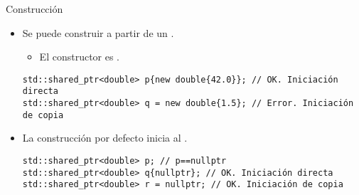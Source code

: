 \begin{frame}[t,fragile]{Construcción}
\begin{itemize}
  \item Se puede construir a partir de un .
    \begin{itemize}
      \item El constructor es .
    \end{itemize}
\begin{lstlisting}
std::shared_ptr<double> p{new double{42.0}}; // OK. Iniciación directa
std::shared_ptr<double> q = new double{1.5}; // Error. Iniciación de copia
\end{lstlisting}

  \item La construcción por defecto inicia al .
\begin{lstlisting}
std::shared_ptr<double> p; // p==nullptr
std::shared_ptr<double> q{nullptr}; // OK. Iniciación directa
std::shared_ptr<double> r = nullptr; // OK. Iniciación de copia
\end{lstlisting}

\end{itemize}
\end{frame}

